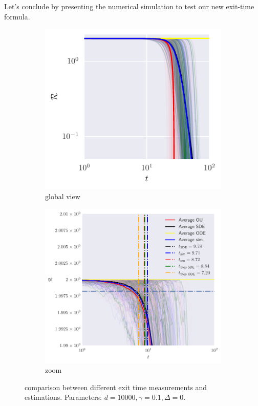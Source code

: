 Let's conclude by presenting the numerical simulation to test our new exit-time formula.
\begin{figure}
  \centering
  \begin{subfigure}{0.495\textwidth}
    \includegraphics[width=1.\textwidth]{figures/sde/spr_final.pdf}
    \caption{global view}
  \end{subfigure}
  \begin{subfigure}{0.9\textwidth}
    \includegraphics[width=1.\textwidth]{figures/sde/spr_final_zoom.pdf}
    \caption{zoom}
  \end{subfigure}
  \caption{
    comparison between different exit time measurements and estimations.
    Parameters: \(d=10000, \gamma=\num{0.1},\Delta=0\).
  }
  \label{fig:spr_final}
\end{figure}
